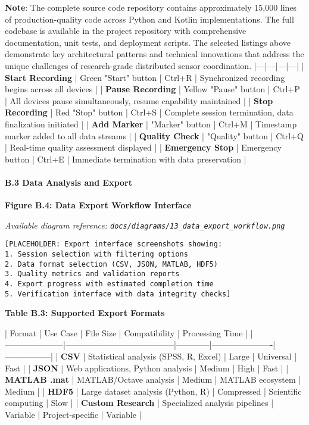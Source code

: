 \documentclass[12pt,a4paper]{article}
\begin{document}
\textbf{Note}: The complete source code repository contains approximately 15,000 lines of production-quality code across
Python and Kotlin implementations. The full codebase is available in the project repository with comprehensive
documentation, unit tests, and deployment scripts. The selected listings above demonstrate key architectural patterns
and technical innovations that address the unique challenges of research-grade distributed sensor coordination.
|---|---|---|---|
| \textbf{Start Recording} | Green "Start" button | Ctrl+R | Synchronized recording begins across all devices |
| \textbf{Pause Recording} | Yellow "Pause" button | Ctrl+P | All devices pause simultaneously, resume capability
maintained |
| \textbf{Stop Recording} | Red "Stop" button | Ctrl+S | Complete session termination, data finalization initiated |
| \textbf{Add Marker} | "Marker" button | Ctrl+M | Timestamp marker added to all data streams |
| \textbf{Quality Check} | "Quality" button | Ctrl+Q | Real-time quality assessment displayed |
| \textbf{Emergency Stop} | Emergency button | Ctrl+E | Immediate termination with data preservation |

\paragraph{B.3 Data Analysis and Export}

\textbf{Figure B.4: Data Export Workflow Interface}

\textit{Available diagram reference: \texttt{docs/diagrams/13\_data\_export\_workflow.png}}

\begin{verbatim}
[PLACEHOLDER: Export interface screenshots showing:
1. Session selection with filtering options
2. Data format selection (CSV, JSON, MATLAB, HDF5)
3. Quality metrics and validation reports
4. Export progress with estimated completion time
5. Verification interface with data integrity checks]
\end{verbatim}

\textbf{Table B.3: Supported Export Formats}

| Format              | Use Case                              | File Size  | Compatibility        | Processing Time |
|---------------------|---------------------------------------|------------|----------------------|-----------------|
| \textbf{CSV}             | Statistical analysis (SPSS, R, Excel) | Large      | Universal            | Fast            |
| \textbf{JSON}            | Web applications, Python analysis     | Medium     | High                 | Fast            |
| \textbf{MATLAB .mat}     | MATLAB/Octave analysis                | Medium     | MATLAB ecosystem     | Medium          |
| \textbf{HDF5}            | Large dataset analysis (Python, R)    | Compressed | Scientific computing | Slow            |
| \textbf{Custom Research} | Specialized analysis pipelines        | Variable   | Project-specific     | Variable        |
\end{document}
